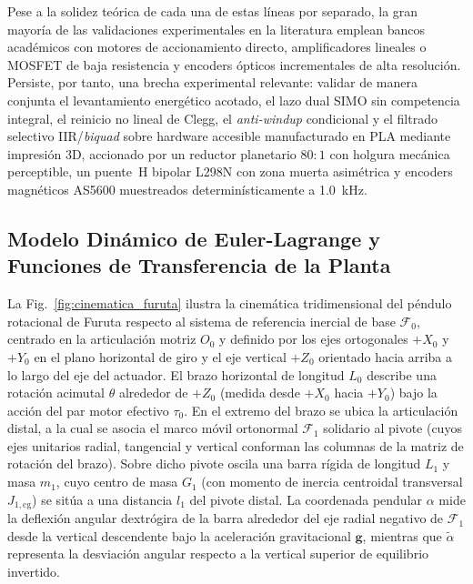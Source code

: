 Pese a la solidez teórica de cada una de estas líneas por separado, la gran mayoría de las validaciones experimentales en la literatura emplean bancos académicos con motores de accionamiento directo, amplificadores lineales o MOSFET de baja resistencia y encoders ópticos incrementales de alta resolución. Persiste, por tanto, una brecha experimental relevante: validar de manera conjunta el levantamiento energético acotado, el lazo dual SIMO sin competencia integral, el reinicio no lineal de Clegg, el \textit{anti-windup} condicional y el filtrado selectivo IIR/\textit{biquad} sobre hardware accesible manufacturado en PLA mediante impresión 3D, accionado por un reductor planetario $80:1$ con holgura mecánica perceptible, un puente~H bipolar L298N con zona muerta asimétrica y encoders magnéticos AS5600 muestreados determinísticamente a \qty{1.0}{\kilo\hertz}.

\subsection{Modelo Dinámico de Euler-Lagrange y Funciones de Transferencia de la Planta}\label{subsec:euler_lagrange}



La \mbox{Fig.~\ref{fig:cinematica_furuta}} ilustra la cinemática tridimensional del péndulo rotacional de Furuta respecto al sistema de referencia inercial de base $\mathcal{F}_0$, centrado en la articulación motriz $O_0$ y definido por los ejes ortogonales $+X_0$ y $+Y_0$ en el plano horizontal de giro y el eje vertical $+Z_0$ orientado hacia arriba a lo largo del eje del actuador. El brazo horizontal de longitud $L_0$ describe una rotación acimutal $\theta$ alrededor de $+Z_0$ (medida desde $+X_0$ hacia $+Y_0$) bajo la acción del par motor efectivo $\tau_0$. En el extremo del brazo se ubica la articulación distal, a la cual se asocia el marco móvil ortonormal $\mathcal{F}_1$ solidario al pivote (cuyos ejes unitarios radial, tangencial y vertical conforman las columnas de la matriz de rotación del brazo). Sobre dicho pivote oscila una barra rígida de longitud $L_1$ y masa $m_1$, cuyo centro de masa $G_1$ (con momento de inercia centroidal transversal $J_{1,\text{cg}}$) se sitúa a una distancia $l_1$ del pivote distal. La coordenada pendular $\alpha$ mide la deflexión angular dextrógira de la barra alrededor del eje radial negativo de $\mathcal{F}_1$ desde la vertical descendente bajo la aceleración gravitacional $\mathbf{g}$, mientras que $\tilde{\alpha}$ representa la desviación angular respecto a la vertical superior de equilibrio invertido.

